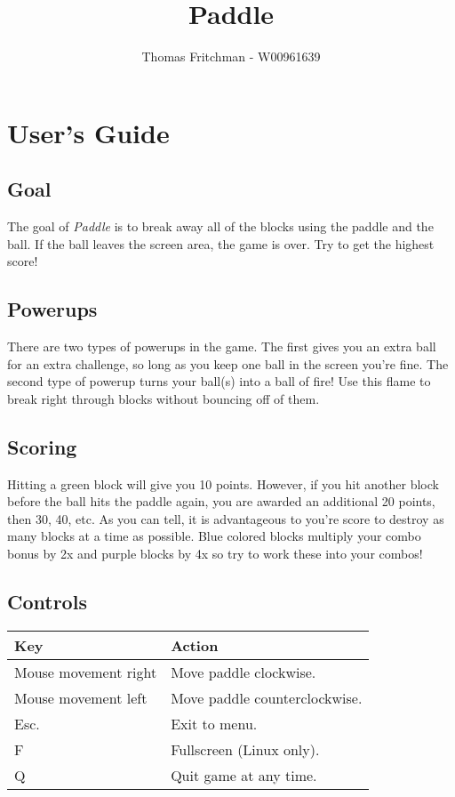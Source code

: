 \documentclass[11pt]{article}
\title{Paddle}
\author{Thomas Fritchman - W00961639}
\begin{document}
\maketitle
\newpage
\tableofcontents
\newpage

\section{User's Guide}
	\subsection{Goal}
	The goal of \textit{Paddle} is to break away all of the blocks
	using the paddle and the ball. If the ball leaves the screen area,
	the game is over. Try to get the highest score!
	\subsection{Powerups}
	There are two types of powerups in the game. The first gives you an
	extra ball for an extra challenge, so long as you keep one ball in
	the screen you're fine. The second type of powerup turns your ball(s)
	into a ball of fire! Use this flame to break right through blocks
	without bouncing off of them.
	\subsection{Scoring}
	Hitting a green block will give you 10 points. However, if you hit
	another block before the ball hits the paddle again, you are awarded
	an additional 20 points, then 30, 40, etc. As you can tell, it is
	advantageous to you're score to destroy as many blocks at a time as
	possible. Blue colored blocks multiply your combo bonus by 2x and
	purple blocks by 4x so try to work these into your combos!
	\subsection{Controls}
	\begin{tabular}{|l|l|}
	\hline
	\textbf{Key} & \textbf{Action}\\
	\hline
	Mouse movement right & Move paddle clockwise.\\
	Mouse movement left & Move paddle counterclockwise.\\
	Esc. & Exit to menu.\\
	F & Fullscreen (Linux only).\\
	Q & Quit game at any time.\\
	\hline
	\end{tabular}
\end{document}
